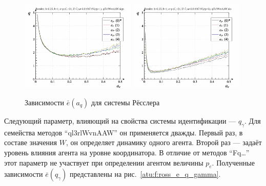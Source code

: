 \begin{figure}[ht!]
\begin{center}
  \includegraphics[width=0.49\textwidth]{p/cha/ross/ross_id-p_a_q_ql3rlWvnAAW_sign.png}
  \hfill
  \includegraphics[width=0.49\textwidth]{p/cha/ross/ross_id-p_a_q_ql3rlWvnAAW_sin.png}
\end{center}
  \caption{Зависимости $\bar{e}(a_q)$ для системы Рёсслера}
\label{atu:f:ross_e_a_q}
\end{figure}

Следующий параметр, влияющий на свойства системы идентификации --- $q_\gamma$.
Для семейства методов ``ql3rlWvnAAW'' он применяется дважды.
Первый раз, в составе значения $W$, он определяет
динамику одного агента. Второй раз --- задаёт уровень влияния агента
на уровне координатора. В отличие от методов ``Fq\ldots''
этот параметр не участвует при определении агентом величины $p_e$.
Полученные зависимости $\bar{e}(q_\gamma)$
представлены на рис.~\ref{atu:f:ross_e_q_gamma}.

